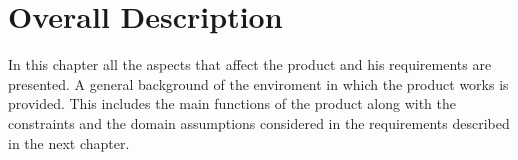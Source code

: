 \chapter{Overall Description}
In this chapter all the aspects that affect the product and his requirements are presented. A general background of the enviroment in which the product works is provided. This includes the main functions of the product along with the constraints and the domain assumptions considered in the requirements described in the next chapter.





